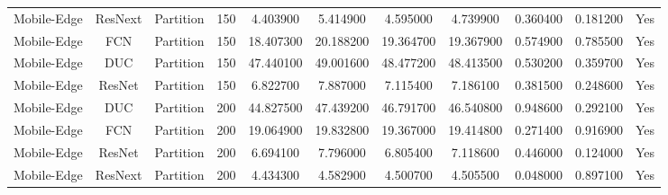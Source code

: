 \begin{tabular}{|c||c||c||c||c||c||c||c||c||c||c|}
Mobile-Edge & ResNext & Partition & 150 & 4.403900 & 5.414900 & 4.595000 & 4.739900 & 0.360400 & 0.181200 & Yes \\
Mobile-Edge & FCN & Partition & 150 & 18.407300 & 20.188200 & 19.364700 & 19.367900 & 0.574900 & 0.785500 & Yes \\
Mobile-Edge & DUC & Partition & 150 & 47.440100 & 49.001600 & 48.477200 & 48.413500 & 0.530200 & 0.359700 & Yes \\
Mobile-Edge & ResNet & Partition & 150 & 6.822700 & 7.887000 & 7.115400 & 7.186100 & 0.381500 & 0.248600 & Yes \\
Mobile-Edge & DUC & Partition & 200 & 44.827500 & 47.439200 & 46.791700 & 46.540800 & 0.948600 & 0.292100 & Yes \\
Mobile-Edge & FCN & Partition & 200 & 19.064900 & 19.832800 & 19.367000 & 19.414800 & 0.271400 & 0.916900 & Yes \\
Mobile-Edge & ResNet & Partition & 200 & 6.694100 & 7.796000 & 6.805400 & 7.118600 & 0.446000 & 0.124000 & Yes \\
Mobile-Edge & ResNext & Partition & 200 & 4.434300 & 4.582900 & 4.500700 & 4.505500 & 0.048000 & 0.897100 & Yes \\
\bottomrule
\end{tabular}

